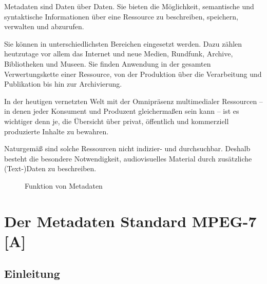 	Metadaten sind Daten über Daten. Sie bieten die Möglichkeit, semantische und syntaktische Informationen über eine Ressource zu beschreiben, speichern, verwalten und abzurufen.
	
	Sie können in unterschiedlichsten Bereichen eingesetzt werden. Dazu zählen heutzutage vor allem das Internet und neue Medien, Rundfunk, Archive, Bibliotheken und Museen. Sie finden Anwendung in der gesamten Verwertungskette einer Ressource, von der Produktion über die Verarbeitung und Publikation bis hin zur Archivierung.

	In der heutigen vernetzten Welt mit der Omnipräsenz multimedialer Ressourcen -- in denen jeder Konsument und Produzent gleichermaßen sein kann -- ist es wichtiger denn je, die Übersicht über privat, öffentlich und kommerziell produzierte Inhalte zu bewahren.
	
	Naturgemäß sind solche Ressourcen nicht indizier- und durchsuchbar. Deshalb besteht die besondere Notwendigkeit, audiovisuelles Material durch zusätzliche (Text-)Daten zu beschreiben.

	\begin{figure}[htbp]
		\caption{Funktion von Metadaten}
		\label{myfigure}
	\end{figure}
	
	
	\section {Der Metadaten Standard MPEG-7 [A]} 
	
	\subsection {Einleitung}
	
